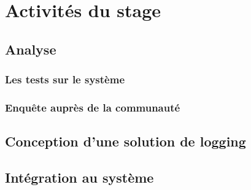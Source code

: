\section{Activités du stage}
\subsection{Analyse}
\subsubsection{Les tests sur le système}
\subsubsection{Enquête auprès de la communauté}
\paragraph[conclusion]{}
\subsection{Conception d'une solution de logging}
\subsection{Intégration au système}
